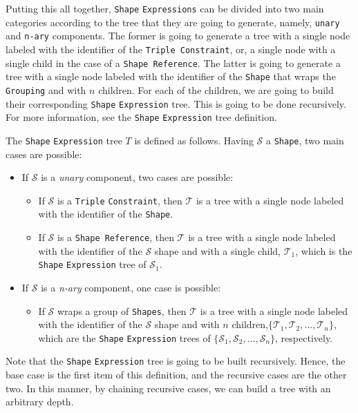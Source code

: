 Putting this all together, \texttt{Shape} \texttt{Expressions} can be divided into two main categories according to the tree that they are going to generate, namely, \texttt{unary} and \texttt{n-ary} components. The former is going to generate a tree with a single node labeled with the identifier of the \texttt{Triple Constraint}, or, a single node with a single child in the case of a \texttt{Shape Reference}. The latter is going to generate a tree with a single node labeled with the identifier of the \texttt{Shape} that wraps the \texttt{Grouping} and with $n$ children. For each of the children, we are going to build their corresponding \texttt{Shape} \texttt{Expression} tree. This is going to be done recursively. For more information, see the \texttt{Shape} \texttt{Expression} tree definition.

\begin{definition}
    The \texttt{Shape} \texttt{Expression} tree $T$ is defined as follows. Having $\mathcal{S}$ a \texttt{Shape}, two main cases are possible:

    \begin{itemize}
        \itemsep0.5em
        \item If $\mathcal{S}$ is a \textit{unary} component, two cases are possible:
              \begin{itemize}
                  \itemsep0.25em
                  \item If $\mathcal{S}$ is a \texttt{Triple} \texttt{Constraint}, then $\mathcal{T}$ is a tree with a single node labeled with the identifier of the \texttt{Shape}.
                  \item If $\mathcal{S}$ is a \texttt{Shape Reference}, then $\mathcal{T}$ is a tree with a single node labeled with the identifier of the $\mathcal{S}$ shape and with a single child, $\mathcal{T}_1$, which is the \texttt{Shape} \texttt{Expression} tree of $\mathcal{S}_1$.
              \end{itemize}
        \item If $\mathcal{S}$ is a \textit{n-ary} component, one case is possible:
              \begin{itemize}
                  \itemsep0.25em
                  \item If $\mathcal{S}$ wraps a group of \texttt{Shapes}, then $\mathcal{T}$ is a tree with a single node labeled with the identifier of the $\mathcal{S}$ shape and with $n$ children,$\{\mathcal{T}_1, \mathcal{T}_2, ..., \mathcal{T}_n\}$, which are the \texttt{Shape} \texttt{Expression} trees of $\{\mathcal{S}_1, \mathcal{S}_2, ..., \mathcal{S}_n\}$, respectively.
              \end{itemize}
    \end{itemize}

    Note that the \texttt{Shape} \texttt{Expression} tree is going to be built recursively. Hence, the base case is the first item of this definition, and the recursive cases are the other two. In this manner, by chaining recursive cases, we can build a tree with an arbitrary depth.
\end{definition}

